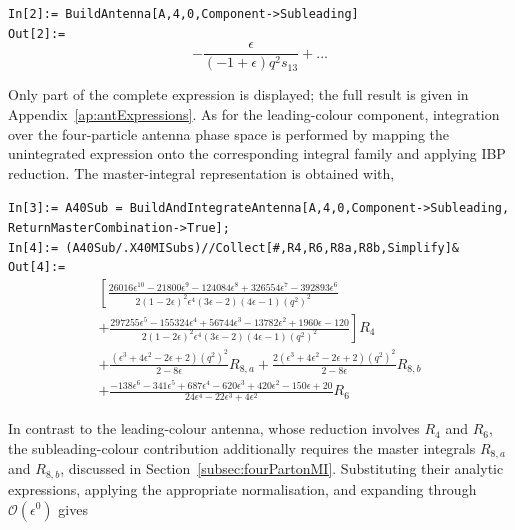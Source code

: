 \begin{mdframed}[backgroundcolor=gray!10, linewidth=0pt]
\texttt{In[2]:= BuildAntenna[A,4,0,Component->Subleading]}\\
\hfill
\texttt{Out[2]:=}
    \begin{equation*}
        -\frac{\epsilon}{(-1+\epsilon)q^2s_{13}}+...
    \end{equation*}
\end{mdframed}

Only part of the complete expression is displayed; the full result is given in
Appendix~\ref{ap:antExpressions}. As for the leading-colour component, integration over the
four-particle antenna phase space is performed by mapping the unintegrated expression onto the
corresponding integral family and applying IBP reduction. The master-integral representation is
obtained with,

\begin{mdframed}[backgroundcolor=gray!10, linewidth=0pt]
\texttt{In[3]:= A40Sub = BuildAndIntegrateAntenna[A,4,0,Component->Subleading,\\ReturnMasterCombination->True];}\\
\texttt{In[4]:= (A40Sub/.X40MISubs)//Collect[\#,{R4,R6,R8a,R8b},Simplify]\&}\\
\hfill
\texttt{Out[4]:=}
    \begin{equation*}
        \begin{gathered}
            \left[\frac{26016\epsilon^{10}-21800\epsilon^9-124084\epsilon^8+326554\epsilon^7-392893\epsilon^6}{2(1-2\epsilon)^2\epsilon^4(3\epsilon-2)(4\epsilon-1)\left(q^2\right)^2}\right.\\
            \left.+\frac{297255\epsilon^5-155324\epsilon^4+56744\epsilon^3-13782\epsilon^2+1960\epsilon-120}{2(1-2\epsilon)^2\epsilon^4(3\epsilon-2)(4\epsilon-1)\left(q^2\right)^2}\right]R_4\\
            +\frac{\left(\epsilon^3+4\epsilon^2-2\epsilon+2\right)\left(q^2\right)^2}{2-8\epsilon}R_{8,a}
            +\frac{2\left(\epsilon^3+4\epsilon^2-2\epsilon+2\right)\left(q^2\right)^2}{2-8\epsilon}R_{8,b}\\
            +\frac{-138\epsilon^6-341\epsilon^5+687\epsilon^4-620\epsilon^3+420\epsilon^2-150\epsilon+20}{24\epsilon^4-22\epsilon^3+4\epsilon^2}R_6
        \end{gathered}
    \end{equation*}
\end{mdframed}

In contrast to the leading-colour antenna, whose reduction involves $R_4$ and $R_6$, the
subleading-colour contribution additionally requires the master integrals $R_{8,a}$ and
$R_{8,b}$, discussed in Section~\ref{subsec:fourPartonMI}. Substituting their analytic
expressions, applying the appropriate normalisation, and expanding through
$\mathcal O(\epsilon^0)$ gives

